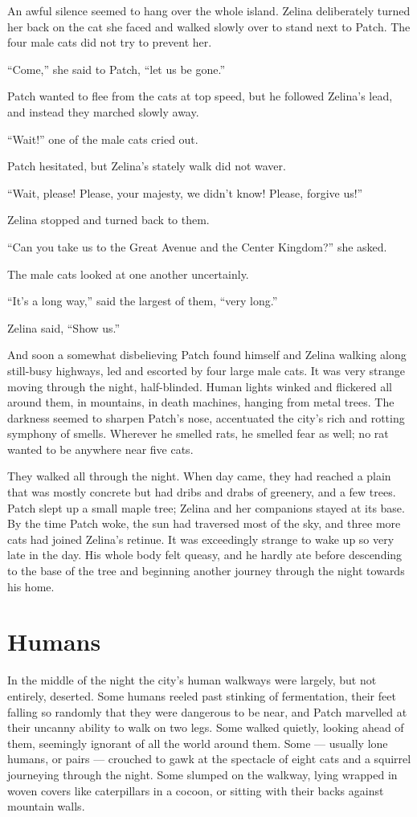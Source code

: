 \documentclass[ebook,oneside,openany,17pt]{memoir}
\renewcommand{\thechapter}{\Roman{chapter}}
\newcounter{sections}
\newcommand{\sections}[1]{%
  \section*{#1}
  \addtocounter{sections}{1}%
  \pdfbookmark[1]{#1}{section.\thechapter.\thesections}}
\begin{document}
An awful silence seemed to hang over the whole island. Zelina
deliberately turned her back on the cat she faced and walked slowly
over to stand next to Patch. The four male cats did not try to prevent
her.

“Come,” she said to Patch, “let us be gone.”

Patch wanted to flee from the cats at top speed, but he followed
Zelina’s lead, and instead they marched slowly away.

“Wait!” one of the male cats cried out.

Patch hesitated, but Zelina’s stately walk did not waver.

“Wait, please! Please, your majesty, we didn’t know! Please, forgive
us!”

Zelina stopped and turned back to them.

“Can you take us to the Great Avenue and the Center Kingdom?” she
asked.

The male cats looked at one another uncertainly.

“It’s a long way,” said the largest of them, “very long.”

Zelina said, “Show us.”

And soon a somewhat disbelieving Patch found himself and Zelina
walking along still-busy highways, led and escorted by four large male
cats. It was very strange moving through the night,
half-blinded. Human lights winked and flickered all around them, in
mountains, in death machines, hanging from metal trees. The darkness
seemed to sharpen Patch’s nose, accentuated the city’s rich and
rotting symphony of smells. Wherever he smelled rats, he smelled fear
as well; no rat wanted to be anywhere near five cats.

They walked all through the night. When day came, they had reached a
plain that was mostly concrete but had dribs and drabs of greenery,
and a few trees. Patch slept up a small maple tree; Zelina and her
companions stayed at its base. By the time Patch woke, the sun had
traversed most of the sky, and three more cats had joined Zelina’s
retinue. It was exceedingly strange to wake up so very late in the
day. His whole body felt queasy, and he hardly ate before descending
to the base of the tree and beginning another journey through the
night towards his home.


\sections{Humans}

In the middle of the night the city’s human walkways were largely, but
not entirely, deserted. Some humans reeled past stinking of
fermentation, their feet falling so randomly that they were dangerous
to be near, and Patch marvelled at their uncanny ability to walk on
two legs. Some walked quietly, looking ahead of them, seemingly
ignorant of all the world around them. Some — usually lone humans, or
pairs — crouched to gawk at the spectacle of eight cats and a squirrel
journeying through the night. Some slumped on the walkway, lying
wrapped in woven covers like caterpillars in a cocoon, or sitting with
their backs against mountain walls.
\end{document}

